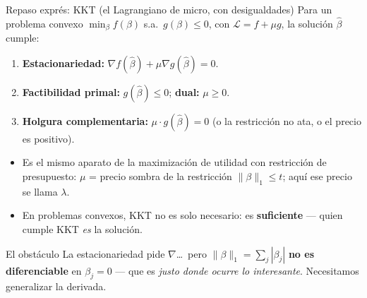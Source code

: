 \documentclass{beamer}
\newcommand{\1}{\mathbb{I}}
\begin{document}
\begin{frame}{Repaso exprés: KKT (el Lagrangiano de micro, con desigualdades)}
\small
Para un problema convexo $\min_{\beta} f(\beta)$ s.a.\ $g(\beta) \leq 0$, con $\mathcal{L} = f + \mu g$, la solución $\hat{\beta}$ cumple:
\begin{enumerate}\itemsep4pt
  \item \textbf{Estacionariedad:} $\nabla f(\hat{\beta}) + \mu \nabla g(\hat{\beta}) = 0$.
  \item \textbf{Factibilidad primal:} $g(\hat{\beta}) \leq 0$; \quad \textbf{dual:} $\mu \geq 0$.
  \item \textbf{Holgura complementaria:} $\mu \cdot g(\hat{\beta}) = 0$ (o la restricción no ata, o el precio es positivo).
\end{enumerate}
\pause

\vspace{0.15cm}
\begin{itemize}\itemsep4pt
  \item Es el mismo aparato de la maximización de utilidad con restricción de presupuesto: $\mu$ = precio sombra de la restricción $\|\beta\|_1 \leq t$; aquí ese precio se llama $\lambda$.
  \item En problemas convexos, KKT no es solo necesario: es \textbf{suficiente} --- quien cumple KKT \emph{es} la solución. \pause
\end{itemize}

\vspace{0.1cm}
\begin{block}{El obstáculo}
La estacionariedad pide $\nabla$\ldots\ pero $\|\beta\|_1 = \sum_j |\beta_j|$ \textbf{no es diferenciable} en $\beta_j = 0$ --- que es \emph{justo donde ocurre lo interesante}. Necesitamos generalizar la derivada.
\end{block}
\end{frame}
\end{document}
